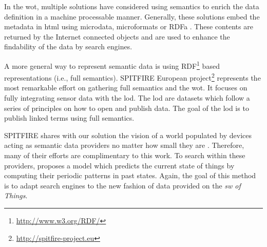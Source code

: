 In the \acl{wot}, multiple solutions have considered using semantics to enrich the data definition in a machine processable manner.
Generally, these solutions embed the metadata in \acs{html} using microdata, microformats or RDFa \citep{mayer_extensible_2011}.
These contents are returned by the Internet connected objects and are used to enhance the findability of the data by search engines.

A more general way to represent semantic data is using RDF\footnote{\url{http://www.w3.org/RDF/}} based representations (i.e., full semantics).
SPITFIRE European project\footnote{\url{http://spitfire-project.eu}} represents the most remarkable effort on gathering full semantics and the \ac{wot}.
It focuses on fully integrating sensor data with the \ac{lod}. 
The \ac{lod} are datasets which follow a series of principles on how to open and publish data.
The goal of the \ac{lod} is to publish linked terms using full semantics.

SPITFIRE shares with our solution the vision of a world populated by devices acting as semantic data providers no matter how small they are \citep{hasemann_rdf_2012}.
Therefore, many of their efforts are complimentary to this work.
To search within these providers, \citet{pfisterer_spitfire:_2011} proposes a model which predicts the current state of things by computing their periodic patterns in past states.
Again, the goal of this method is to adapt search engines to the new fashion of data provided on the \emph{\acl{sw} of Things}.


